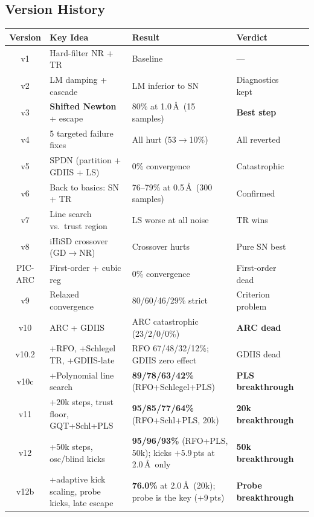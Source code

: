 \documentclass[11pt,a4paper]{article}
\theoremstyle{definition}
\begin{document}
\subsection{Version History}

\begin{longtable}{clp{5cm}p{3cm}l}
\toprule
\textbf{Version} & \textbf{Key Idea} & \textbf{Result} & \textbf{Verdict} \\
\midrule
\endhead

v1 & Hard-filter NR + TR & Baseline & --- \\
v2 & LM damping + cascade & LM inferior to SN & Diagnostics kept \\
v3 & \textbf{Shifted Newton} + escape & 80\% at 1.0\,\AA\ (15 samples) & \textbf{Best step} \\
v4 & 5 targeted failure fixes & All hurt (53$\to$10\%) & All reverted \\
v5 & SPDN (partition + GDIIS + LS) & 0\% convergence & Catastrophic \\
v6 & Back to basics: SN + TR & 76--79\% at 0.5\,\AA\ (300 samples) & Confirmed \\
v7 & Line search vs.\ trust region & LS worse at all noise & TR wins \\
v8 & iHiSD crossover (GD$\to$NR) & Crossover hurts & Pure SN best \\
PIC-ARC & First-order + cubic reg & 0\% convergence & First-order dead \\
v9 & Relaxed convergence & 80/60/46/29\% strict & Criterion problem \\
v10 & ARC + GDIIS & ARC catastrophic (23/2/0/0\%) & \textbf{ARC dead} \\
v10.2 & +RFO, +Schlegel TR, +GDIIS-late & RFO 67/48/32/12\%; GDIIS zero effect & GDIIS dead \\
v10c & +Polynomial line search & \textbf{89/78/63/42\%} (RFO+Schlegel+PLS) & \textbf{PLS breakthrough} \\
v11 & +20k steps, trust floor, GQT+Schl+PLS & \textbf{95/85/77/64\%} (RFO+Schl+PLS, 20k) & \textbf{20k breakthrough} \\
v12 & +50k steps, osc/blind kicks & \textbf{95/96/93\%} (RFO+PLS, 50k); kicks $+$5.9\,pts at 2.0\,\AA\ only & \textbf{50k breakthrough} \\
v12b & +adaptive kick scaling, probe kicks, late escape & \textbf{76.0\%} at 2.0\,\AA\ (20k); probe is the key ($+$9\,pts) & \textbf{Probe breakthrough} \\
\bottomrule
\end{longtable}
\end{document}
